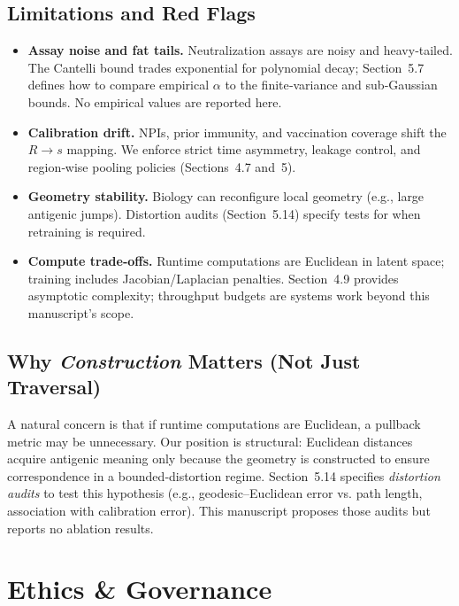 \documentclass[11pt]{article}
\begin{document}
\subsection{Limitations and Red Flags}
\label{sec:limits}
\begin{itemize}[leftmargin=*, itemsep=2pt, topsep=2pt]
\item \textbf{Assay noise and fat tails.} Neutralization assays are noisy and heavy‑tailed. The Cantelli bound trades exponential for polynomial decay; Section~5.7 defines how to compare empirical $\alpha$ to the finite‑variance and sub‑Gaussian bounds. No empirical values are reported here.
\item \textbf{Calibration drift.} NPIs, prior immunity, and vaccination coverage shift the $R\!\to\!s$ mapping. We enforce strict time asymmetry, leakage control, and region‑wise pooling policies (Sections~4.7 and 5).
\item \textbf{Geometry stability.} Biology can reconfigure local geometry (e.g., large antigenic jumps). Distortion audits (Section~5.14) specify tests for when retraining is required.
\item \textbf{Compute trade‑offs.} Runtime computations are Euclidean in latent space; training includes Jacobian/Laplacian penalties. Section 4.9 provides asymptotic complexity; throughput budgets are systems work beyond this manuscript’s scope.
\end{itemize}

\subsection{Why \emph{Construction} Matters (Not Just Traversal)}
\label{sec:construction-matters}
A natural concern is that if runtime computations are Euclidean, a pullback metric may be unnecessary. Our position is structural: Euclidean distances acquire antigenic meaning only because the geometry is constructed to ensure correspondence in a bounded‑distortion regime. Section~5.14 specifies \emph{distortion audits} to test this hypothesis (e.g., geodesic--Euclidean error vs. path length, association with calibration error). This manuscript proposes those audits but reports no ablation results.


\section{Ethics \& Governance}
\label{sec:ethics}
\end{document}
